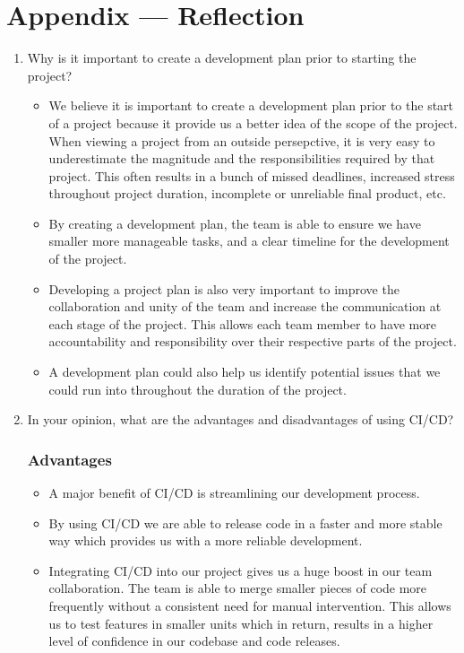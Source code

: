 \documentclass{article}
\begin{document}
\section*{Appendix --- Reflection}
\begin{enumerate}
    \item Why is it important to create a development plan prior to starting the project?

\begin{itemize}
  \item We believe it is important to create a development plan prior to the start of
  a project because it provide us a better idea of the scope of the project. When 
  viewing a project from an outside persepctive, it is very easy to underestimate
  the magnitude and the responsibilities required by that project. This often results
  in a bunch of missed deadlines, increased stress throughout project duration, 
  incomplete or unreliable final product, etc.
  \item By creating a development plan, the team is able to ensure we have smaller 
  more manageable tasks, and a clear timeline for the development of the project.
  \item Developing a project plan is also very important to improve the collaboration
  and unity of the team and increase the communication at each stage of the project.
  This allows each team member to have more accountability and responsibility over
  their respective parts of the project.
  \item A development plan could also help us identify potential issues that we could
  run into throughout the duration of the project.
\end{itemize}

    \item In your opinion, what are the advantages and disadvantages of using CI/CD?
    
\subsubsection*{Advantages}
\begin{itemize}
  \item A major benefit of CI/CD is streamlining our development process.
  \item By using CI/CD we are able to release code in a faster and more stable way which
  provides us with a more reliable development.
  \item Integrating CI/CD into our project gives us a huge boost in our team collaboration.
  The team is able to merge smaller pieces of code more frequently without a consistent
  need for manual intervention. This allows us to test features in smaller units which in
  return, results in a higher level of confidence in our codebase and code releases.
\end{itemize}


\end{enumerate}
\end{document}
